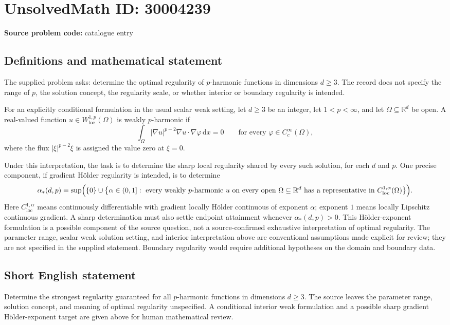 \documentclass[11pt]{article}
\newcommand{\R}{\mathbb{R}}
\begin{document}
\section*{UnsolvedMath ID: 30004239}
\textbf{Source problem code:} catalogue entry
\subsection{Definitions and mathematical statement}
The supplied problem asks: determine the optimal regularity of \(p\)-harmonic functions in dimensions \(d\geq 3\). The record does not specify the range of \(p\), the solution concept, the regularity scale, or whether interior or boundary regularity is intended.

For an explicitly conditional formulation in the usual scalar weak setting, let \(d\geq 3\) be an integer, let \(1<p<\infty\), and let \(\Omega\subseteq\R^d\) be open. A real-valued function \(u\in W^{1,p}_{\mathrm{loc}}(\Omega)\) is weakly \(p\)-harmonic if
\[
\int_\Omega |\nabla u|^{p-2}\nabla u\cdot\nabla\varphi\,\mathrm{d}x=0
\qquad\text{for every }\varphi\in C_c^\infty(\Omega),
\]
where the flux \(|\xi|^{p-2}\xi\) is assigned the value zero at \(\xi=0\).

Under this interpretation, the task is to determine the sharp local regularity shared by every such solution, for each \(d\) and \(p\). One precise component, if gradient H\"older regularity is intended, is to determine
\[
\alpha_*(d,p)=\sup\Bigl(\{0\}\cup\bigl\{\alpha\in(0,1]:
\text{ every weakly }p\text{-harmonic }u\text{ on every open }\Omega\subseteq\R^d
\text{ has a representative in }C^{1,\alpha}_{\mathrm{loc}}(\Omega)
\bigr\}\Bigr).
\]
Here \(C^{1,\alpha}_{\mathrm{loc}}\) means continuously differentiable with gradient locally H\"older continuous of exponent \(\alpha\); exponent \(1\) means locally Lipschitz continuous gradient. A sharp determination must also settle endpoint attainment whenever \(\alpha_*(d,p)>0\). This H\"older-exponent formulation is a possible component of the source question, not a source-confirmed exhaustive interpretation of optimal regularity. The parameter range, scalar weak solution setting, and interior interpretation above are conventional assumptions made explicit for review; they are not specified in the supplied statement. Boundary regularity would require additional hypotheses on the domain and boundary data.
\subsection{Short English statement}
Determine the strongest regularity guaranteed for all \(p\)-harmonic functions in dimensions \(d\geq3\). The source leaves the parameter range, solution concept, and meaning of optimal regularity unspecified. A conditional interior weak formulation and a possible sharp gradient H\"older-exponent target are given above for human mathematical review.
\end{document}
